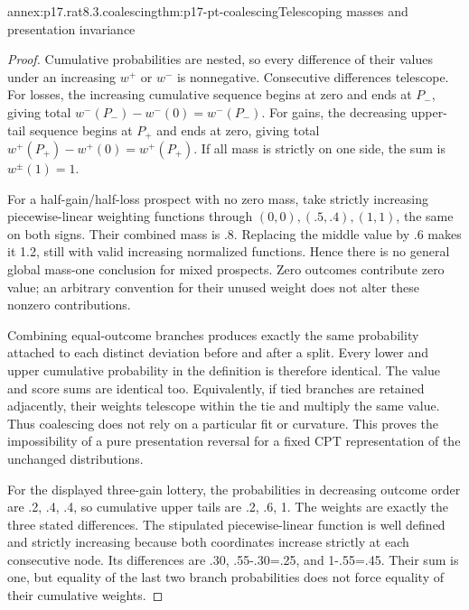 \begin{annexitem}{annex:p17.rat8.3.coalescing}{thm:p17-pt-coalescing}{Telescoping masses and presentation invariance}
\begin{proof}
Cumulative probabilities are nested, so every difference of
their values under an increasing \(w^+\) or \(w^-\) is
nonnegative. Consecutive differences telescope. For losses,
the increasing cumulative sequence begins at zero and ends at
\(P_-\), giving total \(w^-(P_-)-w^-(0)=w^-(P_-)\).
For gains, the decreasing upper-tail sequence begins at
\(P_+\) and ends at zero, giving total
\(w^+(P_+)-w^+(0)=w^+(P_+)\). If all mass is strictly
on one side, the sum is \(w^\pm(1)=1\).

For a half-gain/half-loss prospect with no zero mass, take
strictly increasing piecewise-linear weighting functions
through \((0,0),(.5,.4),(1,1)\), the same on both signs.
Their combined mass is .8. Replacing the middle value by
.6 makes it 1.2, still with valid increasing normalized
functions. Hence there is no general global mass-one
conclusion for mixed prospects. Zero outcomes contribute
zero value; an arbitrary convention for their unused
weight does not alter these nonzero contributions.

Combining equal-outcome branches produces exactly the
same probability attached to each distinct deviation
before and after a split. Every lower and upper cumulative
probability in the definition is therefore identical.
The value and score sums are identical too. Equivalently,
if tied branches are retained adjacently, their weights
telescope within the tie and multiply the same value.
Thus coalescing does not rely on a particular fit or
curvature. This proves the impossibility of a pure
presentation reversal for a fixed CPT representation of
the unchanged distributions.

For the displayed three-gain lottery, the probabilities
in decreasing outcome order are .2, .4, .4, so cumulative
upper tails are .2, .6, 1. The weights are exactly the
three stated differences. The stipulated piecewise-linear
function is well defined and strictly increasing because
both coordinates increase strictly at each consecutive
node. Its differences are .30, .55-.30=.25, and
1-.55=.45. Their sum is one, but equality of the last
two branch probabilities does not force equality of
their cumulative weights.
\end{proof}
\end{annexitem}

